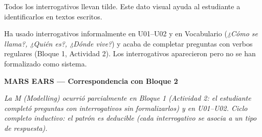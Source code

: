 \documentclass[a4paper,10pt]{article}
\begin{document}
\vspace{0.2cm}

Todos los interrogativos llevan tilde. Este dato visual ayuda al estudiante a identificarlos en textos escritos.

\vspace{0.3cm}

\begin{notabox}
Ha usado interrogativos informalmente en U01--U02 y en Vocabulario (\textit{¿Cómo se llama?, ¿Quién es?, ¿Dónde vive?}) y acaba de completar preguntas con verbos regulares (Bloque 1, Actividad 2). Los interrogativos aparecieron pero no se han formalizado como sistema.
\end{notabox}

\newpage


\begin{center}
{\Large\textbf{\textcolor{naranja}{MARS EARS — Correspondencia con Bloque 2}}}
\end{center}

\vspace{0.3cm}

{\small\textit{La M (Modelling) ocurrió parcialmente en Bloque 1 (Actividad 2: el estudiante completó preguntas con interrogativos sin formalizarlos) y en U01--U02. Ciclo completo inductivo: el patrón es deducible (cada interrogativo se asocia a un tipo de respuesta).}}

\vspace{0.4cm}
\end{document}
